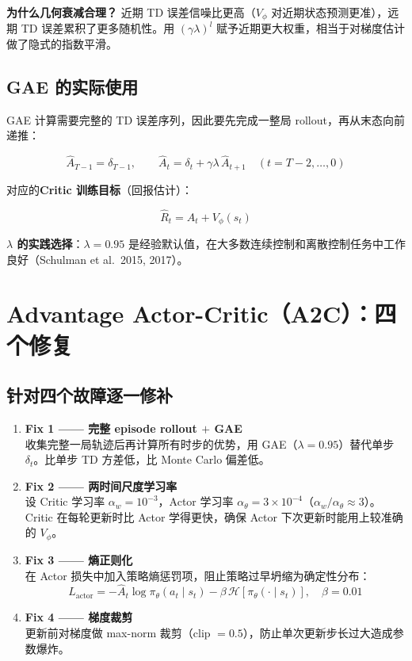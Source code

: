 \documentclass{article}
\begin{document}
\textbf{为什么几何衰减合理？} 近期 TD 误差信噪比更高（$V_\phi$ 对近期状态预测更准），远期 TD 误差累积了更多随机性。用 $(\gamma\lambda)^l$ 赋予近期更大权重，相当于对梯度估计做了隐式的指数平滑。

\subsection*{GAE 的实际使用}

GAE 计算需要完整的 TD 误差序列，因此要先完成一整局 rollout，再从末态向前递推：

\[
\hat{A}_{T-1} = \delta_{T-1}, \qquad
\hat{A}_t = \delta_t + \gamma\lambda\,\hat{A}_{t+1} \quad (t = T-2, \ldots, 0)
\]

对应的\textbf{Critic 训练目标}（回报估计）：

\[
\hat{R}_t = \hat{A}_t + V_\phi(s_t)
\]

\textbf{$\lambda$ 的实践选择}：$\lambda = 0.95$ 是经验默认值，在大多数连续控制和离散控制任务中工作良好（Schulman et al.\ 2015, 2017）。

\section*{Advantage Actor-Critic（A2C）：四个修复}

\subsection*{针对四个故障逐一修补}

\begin{enumerate}
  \item \textbf{Fix 1 —— 完整 episode rollout $+$ GAE}\\
        收集完整一局轨迹后再计算所有时步的优势，用 GAE（$\lambda = 0.95$）替代单步 $\delta_t$。比单步 TD 方差低，比 Monte Carlo 偏差低。

  \item \textbf{Fix 2 —— 两时间尺度学习率}\\
        设 Critic 学习率 $\alpha_w = 10^{-3}$，Actor 学习率 $\alpha_\theta = 3\times 10^{-4}$（$\alpha_w / \alpha_\theta \approx 3$）。Critic 在每轮更新时比 Actor 学得更快，确保 Actor 下次更新时能用上较准确的 $V_\phi$。

  \item \textbf{Fix 3 —— 熵正则化}\\
        在 Actor 损失中加入策略熵惩罚项，阻止策略过早坍缩为确定性分布：
        \[
        L_{\text{actor}} = -\hat{A}_t \log\pi_\theta(a_t \mid s_t) - \beta\,\mathcal{H}[\pi_\theta(\cdot \mid s_t)], \quad \beta = 0.01
        \]

  \item \textbf{Fix 4 —— 梯度裁剪}\\
        更新前对梯度做 max-norm 裁剪（clip $= 0.5$），防止单次更新步长过大造成参数爆炸。
\end{enumerate}
\end{document}
